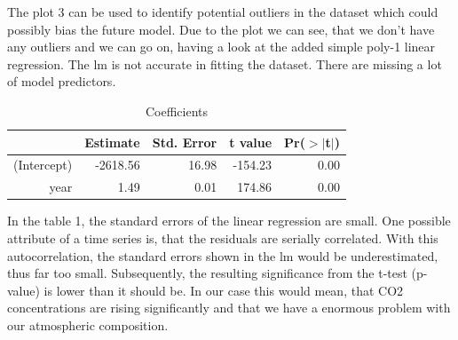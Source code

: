 \documentclass[10pt, a4paper]{article} %
\begin{document}
The plot 3 can be used to identify potential outliers in the dataset which could possibly bias the future model.  Due to the plot we can see, that we don't have any outliers and we can go on, having a look at the added simple poly-1 linear regression. The lm is not accurate in fitting the dataset. There are missing a lot of model predictors.

\begin{Schunk}
\begin{table}[ht]
\centering
\begin{tabular}{rrrrr}
  \hline
 & Estimate & Std. Error & t value & Pr($>$$|$t$|$) \\ 
  \hline
(Intercept) & -2618.56 & 16.98 & -154.23 & 0.00 \\ 
  year & 1.49 & 0.01 & 174.86 & 0.00 \\ 
   \hline
\end{tabular}
\caption{Coefficients} 
\end{table}\end{Schunk}
In the table 1, the standard errors of the linear regression are small.  One possible attribute of a time series is, that the residuals are serially correlated. With this autocorrelation, the standard errors shown in the lm would be underestimated, thus far too small.  Subsequently, the resulting significance  from the t-test (p-value) is lower than it should be. In our case this would mean, that CO2 concentrations are rising significantly and that we have a enormous problem with our atmospheric composition. 
\end{document}
